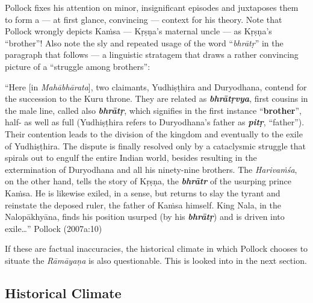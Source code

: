 Pollock fixes his attention on minor, insignificant episodes and juxtaposes them to form a --- at first glance, convincing --- context for his theory. Note that Pollock wrongly depicts Kaṁsa --- Kṛṣṇa’s maternal uncle --- as Kṛṣṇa's “brother”! Also note the sly and repeated usage of the word “{\sl bhrātṛ}” in the paragraph that follows --- a linguistic stratagem that draws a rather convincing picture of a “struggle among brothers”: 
\vskip 1.3pt

\begin{myquote}
“Here [in {\sl Mahābhārata}], two claimants, Yudhiṣṭhira and Duryodhana, contend for the succession to the Kuru throne. They are related as {\sl\bfseries bhrātṛvya}, first cousins in the male line, called also {\sl\bfseries bhrātṛ}, which signifies in the first instance “{\bf brother}”, half- as well as full (Yudhiṣṭhira refers to Duryodhana’s father as {\sl\bfseries pitṛ}, “father”). Their contention leads to the division of the kingdom and eventually to the exile of Yudhiṣṭhira. The dispute is finally resolved only by a cataclysmic struggle that spirals out to engulf the entire Indian world, besides resulting in the extermination of Duryodhana and all his ninety-nine brothers. The {\sl Harivaṁśa}, on the other hand, tells the story of Kṛṣṇa, the {\sl\bfseries bhrātr} of the usurping prince Kaṁsa. He is likewise exiled, in a sense, but returns to slay the tyrant and reinstate the deposed ruler, the father of Kaṁsa himself. King Nala, in the Nalopākhyāna, finds his position usurped (by his {\sl\bfseries bhrātṛ}) and is driven into exile…”
\hfill Pollock (2007a:10)
\end{myquote}

If these are factual inaccuracies, the historical climate in which Pollock chooses to situate the {\sl Rāmāyaṇa} is also questionable. This is looked into in the next section.

\subsection{Historical Climate}\label{sec1.1.2}

